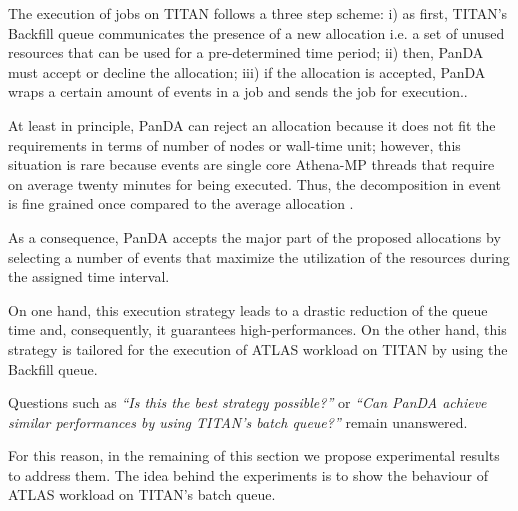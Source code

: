 
The execution of jobs on TITAN follows a three step scheme: i) as first, TITAN's Backfill queue communicates the presence of a new allocation i.e. a set of unused resources that can be used for a pre-determined time period; ii) then, PanDA must accept or decline the allocation; iii) if the allocation is accepted, PanDA wraps a certain amount of events in a job and sends the job for execution..

At least in principle, PanDA can reject an allocation because it does not fit the requirements in terms of number of nodes or wall-time unit; however, this situation is rare because events are single core Athena-MP threads that require on average twenty minutes for being executed. Thus, the decomposition in event is fine grained once compared to the average allocation .

As a consequence, PanDA accepts the major part of the proposed allocations by selecting a number of events that maximize the utilization of the resources during the assigned time interval.

On one hand, this  execution strategy leads to a drastic reduction of the queue time and, consequently, it guarantees high-performances. On the other hand, this strategy is tailored for the execution of ATLAS workload on TITAN by using the Backfill queue.

Questions such as \emph{``Is this the best strategy possible?''} or \emph{``Can PanDA achieve similar performances by using TITAN's batch queue?''}  remain unanswered.

For this reason, in the remaining of this section we propose experimental results to address them. The idea behind the experiments is to show the behaviour of ATLAS workload on TITAN's batch queue.

